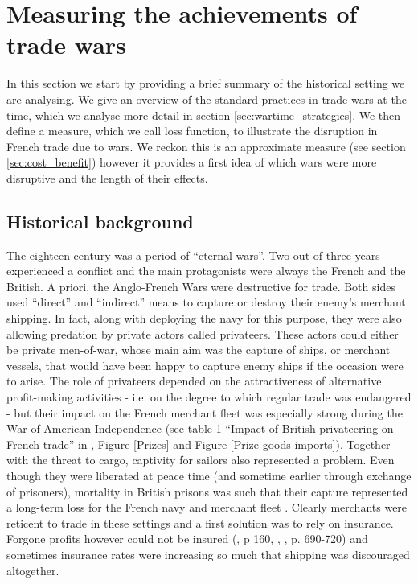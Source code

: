 \documentclass[12pt,a4paper,notitlepage,english]{article}
\begin{document}
\section{Measuring the achievements of trade wars}
In this section we start by providing a brief summary of the historical setting we are analysing. We give an overview of the standard practices in trade wars at the time, which we analyse more detail in section \ref{sec:wartime_strategies}. We then define a measure, which we call loss function, to illustrate the disruption in French trade due to wars. We reckon this is an approximate measure (see section \ref{sec:cost_benefit}) however it provides a first idea of which wars were more disruptive and the length of their effects. 

\subsection{Historical background}
\label{sec:historical_background}
The eighteen century was a period of ``eternal wars''. Two out of three years experienced a conflict and the main protagonists were always the French and the British. 
A priori, the Anglo-French Wars were destructive for trade. 
Both sides used ``direct'' and ``indirect'' means to capture or destroy their enemy's merchant shipping. In fact, along with deploying the navy for this purpose, they were also allowing predation by private actors called privateers. 
These actors could either be private men-of-war, whose main aim was the capture of ships, or merchant vessels, that would have been happy to capture enemy ships if the occasion were to arise.
The role of privateers depended on the attractiveness of alternative profit-making activities \citep[p. 673]{Villiers2002,Hillmann2011} - i.e. on the degree to which regular trade was endangered  - but their impact on the French merchant fleet was especially strong during the War of American Independence (see table 1 ``Impact of British privateering on French trade'' in \cite{Hillmann2011},
Figure \ref{Prizes} and Figure \ref{Prize goods imports}).
Together with the threat to cargo, captivity for sailors also represented a problem. Even though they were liberated at peace time (and sometime earlier through exchange of prisoners), mortality in British prisons was such that their capture represented a long-term loss for the French navy and merchant fleet \citep{LeGoff1998}.
Clearly merchants were reticent to trade in these settings and a first solution was to rely on insurance. Forgone profits however could not be insured (\cite{Ducoin1993}, p 160, \cite{Villiers2002}, \cite{Butel1973}, p. 690-720) and sometimes insurance rates were increasing so much that shipping was discouraged altogether. 
\end{document}
